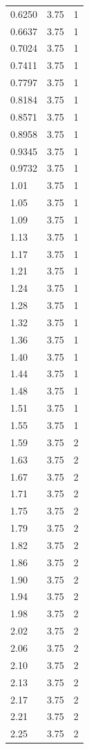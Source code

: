 \begin{longtable}{lrr}
  0.6250 & 3.75 & 1 \\
  0.6637 & 3.75 & 1 \\
  0.7024 & 3.75 & 1 \\
  0.7411 & 3.75 & 1 \\
  0.7797 & 3.75 & 1 \\
  0.8184 & 3.75 & 1 \\
  0.8571 & 3.75 & 1 \\
  0.8958 & 3.75 & 1 \\
  0.9345 & 3.75 & 1 \\
  0.9732 & 3.75 & 1 \\
  1.01 & 3.75 & 1 \\
  1.05 & 3.75 & 1 \\
  1.09 & 3.75 & 1 \\
  1.13 & 3.75 & 1 \\
  1.17 & 3.75 & 1 \\
  1.21 & 3.75 & 1 \\
  1.24 & 3.75 & 1 \\
  1.28 & 3.75 & 1 \\
  1.32 & 3.75 & 1 \\
  1.36 & 3.75 & 1 \\
  1.40 & 3.75 & 1 \\
  1.44 & 3.75 & 1 \\
  1.48 & 3.75 & 1 \\
  1.51 & 3.75 & 1 \\
  1.55 & 3.75 & 1 \\
  1.59 & 3.75 & 2 \\
  1.63 & 3.75 & 2 \\
  1.67 & 3.75 & 2 \\
  1.71 & 3.75 & 2 \\
  1.75 & 3.75 & 2 \\
  1.79 & 3.75 & 2 \\
  1.82 & 3.75 & 2 \\
  1.86 & 3.75 & 2 \\
  1.90 & 3.75 & 2 \\
  1.94 & 3.75 & 2 \\
  1.98 & 3.75 & 2 \\
  2.02 & 3.75 & 2 \\
  2.06 & 3.75 & 2 \\
  2.10 & 3.75 & 2 \\
  2.13 & 3.75 & 2 \\
  2.17 & 3.75 & 2 \\
  2.21 & 3.75 & 2 \\
  2.25 & 3.75 & 2 \\

\end{longtable}
